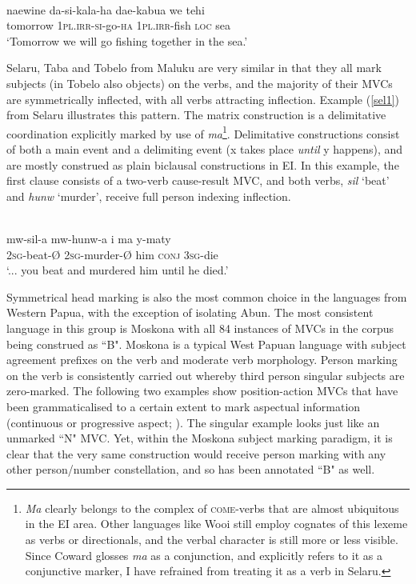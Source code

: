 \ea \label{}
\\
\gll naewine da-si-kala-ha dae-kabua we tehi \\
tomorrow 1\textsc{pl}.\textsc{irr}-\textsc{si}-go-\textsc{ha} 1\textsc{pl}.\textsc{irr}-fish \textsc{loc} sea \\
\glft `Tomorrow we will go fishing together in the sea.' \\ 
\z

Selaru, Taba and Tobelo from Maluku are very similar in that they all mark subjects (in Tobelo also objects) on the verbs, and the majority of their MVCs are symmetrically inflected, with all verbs attracting inflection. Example (\ref{sel1}) from Selaru illustrates this pattern. The matrix construction is a delimitative coordination explicitly marked by use of \textit{ma}\footnote{\textit{Ma} clearly belongs to the complex of \textsc{come}-verbs that are almost ubiquitous in the EI area. Other languages like Wooi still employ cognates of this lexeme as verbs or directionals, and the verbal character is still more or less visible. Since Coward glosses \textit{ma} as a conjunction, and explicitly refers to it as a conjunctive marker, I have refrained from treating it as a verb in Selaru.}. Delimitative constructions consist of both a main event and a delimiting event (x takes place \textit{until} y happens), and are mostly construed as plain biclausal constructions in EI. In this example, the first clause consists of a two-verb cause-result MVC, and both verbs, \textit{sil} `beat' and \textit{hunw} `murder', receive full person indexing inflection.

\ea \label{sel1}
\\
\gll mw-sil-a mw-hunw-a i ma y-maty \\
2\textsc{sg}-beat-Ø 2\textsc{sg}-murder-Ø him \textsc{conj} 3\textsc{sg}-die \\
\glft `... you beat and murdered him until he died.'\\ 
\z

Symmetrical head marking is also the most common choice in the languages from Western Papua, with the exception of isolating Abun. The most consistent language in this group is Moskona with all 84 instances of MVCs in the corpus being construed as ``B". Moskona is a typical West Papuan language with subject agreement prefixes on the verb and moderate verb morphology. Person marking on the verb is consistently carried out whereby third person singular subjects are zero-marked. The following two examples show position-action MVCs that have been grammaticalised to a certain extent to mark aspectual information (continuous or progressive aspect; \citealt[296]{gravelle2010grammar}). The singular example looks just like an unmarked ``N" MVC. Yet, within the Moskona subject marking paradigm, it is clear that the very same construction would receive person marking with any other person/number constellation, and so has been annotated ``B" as well.

